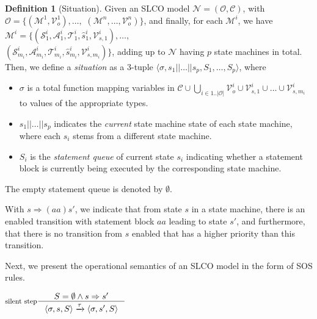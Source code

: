 \documentclass[parskip]{scrartcl}
\newcommand{\step}[1]{\xrightarrow{#1}}
\newcommand{\smodel}{\mathcal{N}\xspace}
\newcommand{\Machines}{\mathcal{M}\xspace}
\newcommand{\Channels}{\mathcal{C}\xspace}
\newcommand{\Variables}{\mathcal{V}\xspace}
\newcommand{\States}{\mathcal{S}\xspace}
\newcommand{\Transitions}{\mathcal{T}\xspace}
\newcommand{\Actions}{\mathcal{A}\xspace}
\newcommand{\Objects}{\mathcal{O}\xspace}
\theoremstyle{definition}
\newtheorem{definition}{Definition}
\begin{document}
\begin{definition}[Situation]
Given an SLCO model $\smodel = (\Objects, \Channels)$, with $\Objects = \{ (\Machines^1, \Variables_o^1),\ldots,$ $(\Machines^n,\ldots,\Variables_o^n) \}$, and finally, for each $\Machines^i$, we have $\Machines^i = \{ (\States^i_1, \Actions^i_1, \Transitions^i_1, \hat s^i_1, \Variables^i_{s,1}), \ldots,$\\ $(\States^i_{m_i}, \Actions^i_{m_i}, \Transitions^i_{m_i}, \hat s^i_{m_i}, \Variables^i_{s, m_i}) \}$, adding up to $\smodel$ having $p$ state machines in total. Then, we define a \emph{situation} as a 3-tuple $\langle \sigma, s_1||\ldots||s_p, S_1,\ldots,S_p \rangle$, where
\begin{itemize}
\item $\sigma$ is a total function mapping variables in $\Channels \cup \bigcup_{i \in 1..|\Objects|}\Variables_o^i \cup \Variables^i_{s,1} \cup \ldots \cup \Variables^i_{s, m_i}$ to values of the appropriate types.
\item $s_1||\ldots||s_p$ indicates the \emph{current} state machine state of each state machine, where each $s_i$ stems from a different state machine.
\item $S_i$ is the \emph{statement queue} of current state $s_i$ indicating whether a statement block is currently being executed by the corresponding state machine.
\end{itemize}
\end{definition}

The empty statement queue is denoted by $\emptyset$.

With $s \Rightarrow(aa) s'$, we indicate that from state $s$ in a state machine, there is an enabled transition with statement block $aa$ leading to state $s'$, and furthermore, that there is no transition from $s$ enabled that has a higher priority than this transition.

Next, we present the operational semantics of an SLCO model in the form of SOS rules.

%
%

$\inference[silent step]{S = \emptyset \wedge s \Rightarrow s'}{\langle \sigma, s, S \rangle \step{\tau} \langle \sigma, s', S\rangle}$
\end{document}
